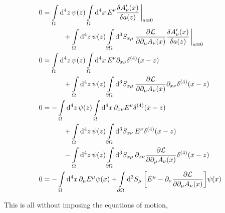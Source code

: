\begin{align}
    0&=\int\limits_\Omega\dd[4]{z}\psi(z)\int\limits_{\Omega}\dd[4]{x}E^\nu\fdv{A_\nu'\qty(x)}{a(z)}\eval_{a\equiv0}\nonumber\\
    &\quad\quad\quad+\int\limits_\Omega\dd[4]{z}\psi(z)\int\limits_{\partial\Omega}\dd[3]{S_{x\mu}}\pdv{\mathcal L}{\partial_{\mu}A_\nu\qty(x)}\fdv{A_\nu'\qty(x)}{a(z)}\eval_{a\equiv0}\\
    0&=\int\limits_\Omega\dd[4]{z}\psi(z)\int\limits_{\Omega}\dd[4]{x}E^\nu\partial_{x\nu}\delta^{(4)}\qty(x-z)\nonumber\\
    &\quad\quad\quad+\int\limits_\Omega\dd[4]{z}\psi(z)\int\limits_{\partial\Omega}\dd[3]{S_{x\mu}}\pdv{\mathcal L}{\partial_{\mu}A_\nu\qty(x)}\partial_{x\nu}\delta^{(4)}\qty(x-z)\\
    0&=-\int\limits_\Omega\dd[4]{z}\psi(z)\int\limits_{\Omega}\dd[4]{x}\partial_{x\nu}E^\nu\delta^{(4)}\qty(x-z)\nonumber\\
    &\quad\quad\quad+\int\limits_\Omega\dd[4]{z}\psi(z)\int\limits_{\partial\Omega}\dd[3]{S_{x\nu}}E^\nu\delta^{(4)}\qty(x-z)\nonumber\\
    &\quad\quad\quad-\int\limits_\Omega\dd[4]{z}\psi(z)\int\limits_{\partial\Omega}\dd[3]{S_{x\mu}}\partial_{x\nu}\pdv{\mathcal L}{\partial_{\mu}A_\nu\qty(x)}\delta^{(4)}\qty(x-z)\\
    0&=-\int\limits_{\Omega}\dd[4]{x}\partial_{\mu}E^\mu\psi(x)+\int\limits_{\partial\Omega}\dd[3]{S_{\mu}}\qty[E^\mu-\partial_{\nu}\pdv{\mathcal L}{\partial_{\mu}A_\nu\qty(x)}]\psi(x)
\end{align}

This is all without imposing the equations of motion,